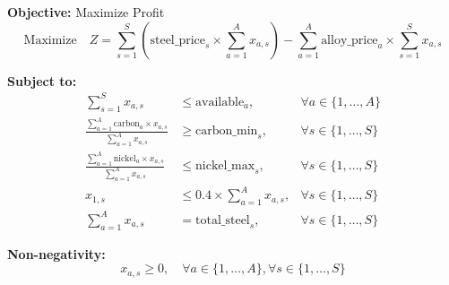 \documentclass{article}
\begin{document}
\textbf{Objective:} Maximize Profit
\[
\text{Maximize} \quad Z = \sum_{s=1}^{S} \left( \text{steel\_price}_s \times \sum_{a=1}^{A} x_{a,s} \right) - \sum_{a=1}^{A} \text{alloy\_price}_a \times \sum_{s=1}^{S} x_{a,s}
\]

\textbf{Subject to:}
\begin{align*}
\sum_{s=1}^{S} x_{a,s} & \leq \text{available}_a, & \forall a \in \{1, \ldots, A\} \\
\frac{\sum_{a=1}^{A} \text{carbon}_a \times x_{a,s}}{\sum_{a=1}^{A} x_{a,s}} & \geq \text{carbon\_min}_s, & \forall s \in \{1, \ldots, S\} \\
\frac{\sum_{a=1}^{A} \text{nickel}_a \times x_{a,s}}{\sum_{a=1}^{A} x_{a,s}} & \leq \text{nickel\_max}_s, & \forall s \in \{1, \ldots, S\} \\
x_{1,s} & \leq 0.4 \times \sum_{a=1}^{A} x_{a,s}, & \forall s \in \{1, \ldots, S\} \\
\sum_{a=1}^{A} x_{a,s} & = \text{total\_steel}_s, & \forall s \in \{1, \ldots, S\}
\end{align*}

\textbf{Non-negativity:}
\[
x_{a,s} \geq 0, \quad \forall a \in \{1, \ldots, A\}, \forall s \in \{1, \ldots, S\}
\]
\end{document}
